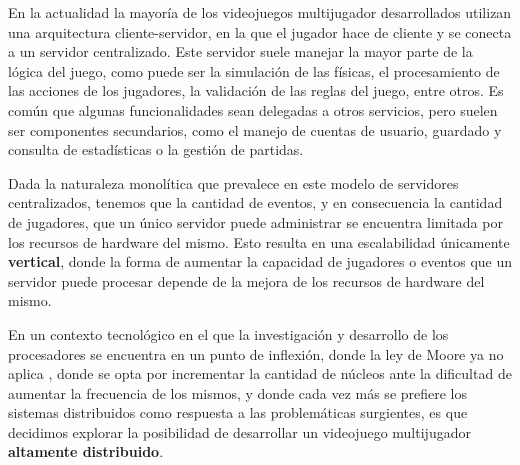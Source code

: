
\noindent En la actualidad la mayoría de los videojuegos multijugador desarrollados
utilizan una arquitectura cliente-servidor, en la que el jugador
hace de cliente y se conecta a un servidor centralizado. Este servidor suele manejar
la mayor parte de la lógica del juego, como puede ser la simulación de las físicas, el procesamiento
de las acciones de los jugadores, la validación de las reglas del juego, entre otros.
Es común que algunas funcionalidades sean delegadas a otros servicios, pero suelen ser componentes
secundarios, como el manejo de cuentas de usuario, guardado y consulta de estadísticas
o la gestión de partidas.

Dada la naturaleza monolítica que prevalece en este modelo de servidores centralizados, tenemos que la cantidad de eventos, y en consecuencia la cantidad de jugadores,
que un único servidor puede administrar se encuentra limitada por los recursos de hardware del mismo.
Esto resulta en una escalabilidad únicamente \textbf{vertical}, donde la forma de aumentar la capacidad
de jugadores o eventos que un servidor puede procesar depende de la mejora de los recursos de hardware del mismo.

En un contexto tecnológico en el que la investigación y desarrollo de los procesadores
se encuentra en un punto de inflexión, donde la ley de Moore ya no aplica \cite{moores-law-is-dead},
donde se opta por incrementar la cantidad de núcleos ante la dificultad de aumentar la frecuencia de los mismos,
y donde cada vez más se prefiere los sistemas distribuidos como respuesta a las problemáticas surgientes,
es que decidimos explorar la posibilidad de desarrollar un videojuego multijugador
\textbf{altamente distribuido}.



